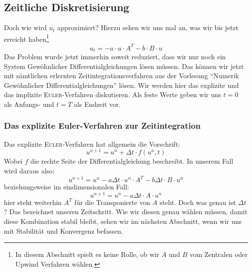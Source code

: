 \documentclass[12pt,a4paper]{scrartcl}
\numberwithin{equation}{section} %
\theoremstyle{definition}
\theoremstyle{plain}
\begin{document}
\subsection{Zeitliche Diskretisierung}
Doch wie wird $u_t$ approximiert? Hierzu sehen wir uns mal an, was wir bis jetzt erreicht haben\footnote{In diesem Abschnitt spielt es keine Rolle, ob wir $A$ und $B$ vom Zentralen oder Upwind Verfahren wählen.}
\begin{equation}
u_t=-a\cdot u\cdot A^T-b\cdot B\cdot u
\end{equation}
Das Problem wurde jetzt immerhin soweit reduziert, dass wir nur noch ein System Gewöhnlicher Differentialgleichungen lösen müssen. Das können wir jetzt mit sämtlichen erlernten Zeitintegrationsverfahren aus der Vorlesung "`Numerik Gewöhnlicher Differentialgleichungen"' lösen. Wir werden hier das explizite und das implizite \textsc{Euler}-Verfahren diskutieren. Als feste Werte geben wir uns $t=0$ als Anfangs- und $t=T$ als Endzeit vor.
\subsubsection{Das explizite Euler-Verfahren zur Zeitintegration}
Das explizite \textsc{Euler}-Verfahren hat allgemein die Vorschrift:
\begin{equation}
u^{n+1}=u^n+\Delta t\cdot f(u^n,t)
\end{equation}
Wobei $f$ die rechte Seite der Differentialgleichung beschreibt. In unserem Fall wird daraus also:
\begin{equation}
u^{n+1}=u^n-a\Delta t\cdot u^n\cdot A^T-b\Delta t\cdot B\cdot u^n\label{eq:expl}
\end{equation}
beziehungsweise im eindimensionalen Fall:
\begin{equation}
u^{n+1}=u^n-a\Delta t\cdot A\cdot u^n
\end{equation}
hier steht weiterhin $A^T$ für die Transponierte von $A$ steht. Doch was genau ist $\Delta t$? Das bezeichnet unseren Zeitschritt. Wie wir diesen genau wählen müssen, damit diese Kombination stabil bleibt, sehen wir im nächsten Abschnitt, wenn wir uns mit Stabilität und Konvergenz befassen.
\end{document}
